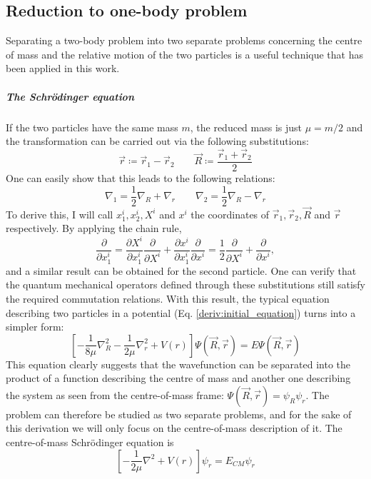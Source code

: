 \begin{appendices}
\chapter{Reduction to one-body problem}\label{appendix:onebody}
Separating a two-body problem into two separate problems concerning the centre of mass and the relative motion of the two particles is a useful technique that has been applied in this work.

\paragraph{The Schrödinger equation}
If the two particles have the same mass \(m\), the reduced mass is just \(\mu = m /2\) and the transformation can be carried out via the following substitutions:
\begin{equation}\label{eq:twobody_transform}
	\vec{r}\coloneqq \vec{r}_1 - \vec{r}_2 \qquad
	\vec{R} \coloneqq \frac{\vec{r}_1 + \vec{r}_2}{2}
\end{equation}
One can easily show that this leads to the following relations:
\begin{equation}
	\nabla _1 = \frac{1}{2} \nabla _R + \nabla _r
	\qquad
	\nabla _2 = \frac{1}{2} \nabla _R - \nabla _r
\end{equation}
To derive this, I will call \(x^i_1, x^i_2, X^i \) and \(x^i\) the coordinates of \(\vec{r}_1, \vec{r}_2, \vec{R} \) and \(\vec{r}\) respectively. By applying the chain rule,
\begin{equation}
	\frac{\partial }{\partial x^i_1} = \frac{\partial X^i}{\partial x^i_1} \frac{\partial }{\partial X^i} + \frac{\partial x^i}{\partial x^i_1} \frac{\partial }{\partial x^i} = \frac{1}{2} \frac{\partial }{\partial X^i} + \frac{\partial }{\partial x^i},
\end{equation}
and a similar result can be obtained for the second particle. One can verify that the quantum mechanical operators defined through these substitutions still satisfy the required commutation relations. With this result, the typical equation describing two particles in a potential (Eq. \eqref{deriv:initial_equation}) turns into a simpler form:
\begin{equation}
	\left[- \frac{1}{8\mu} \nabla _R^{2} - \frac{1}{2\mu } \nabla _r^2 + V(r)\right] \Psi (\vec{R},\vec{r})= E \Psi (\vec{R},\vec{r})
\end{equation}
This equation clearly suggests that the wavefunction can be separated into the product of a function describing the centre of mass and another one describing the system as seen from the centre-of-mass frame: \(\Psi (\vec{R},\vec{r}) = \psi_R \psi _r\). The problem can therefore be studied as two separate problems, and for the sake of this derivation we will only focus on the centre-of-mass description of it. The centre-of-mass Schrödinger equation is
\begin{equation}
	\left[- \frac{1}{2\mu }\nabla^2 + V(r)\right]\psi _r = E_{CM} \psi _r
\end{equation}


\end{appendices}
